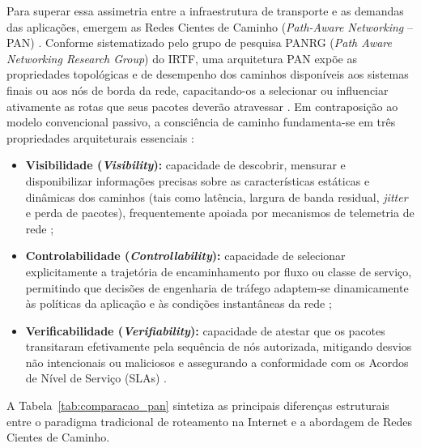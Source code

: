 Para superar essa assimetria entre a infraestrutura de transporte e as demandas das aplicações, emergem as Redes Cientes de Caminho (\textit{Path-Aware Networking} -- PAN) \cite{trammell2022rfc, borges2024pot}. Conforme sistematizado pelo grupo de pesquisa PANRG (\textit{Path Aware Networking Research Group}) do IRTF, uma arquitetura PAN expõe as propriedades topológicas e de desempenho dos caminhos disponíveis aos sistemas finais ou aos nós de borda da rede, capacitando-os a selecionar ou influenciar ativamente as rotas que seus pacotes deverão atravessar \cite{trammell2022rfc, wei2026panqosr}. Em contraposição ao modelo convencional passivo, a consciência de caminho fundamenta-se em três propriedades arquiteturais essenciais \cite{borges2024pot}:
\begin{itemize}
    \item \textbf{Visibilidade (\textit{Visibility}):} capacidade de descobrir, mensurar e disponibilizar informações precisas sobre as características estáticas e dinâmicas dos caminhos (tais como latência, largura de banda residual, \textit{jitter} e perda de pacotes), frequentemente apoiada por mecanismos de telemetria de rede \cite{trammell2022rfc, borges2024pot};
    \item \textbf{Controlabilidade (\textit{Controllability}):} capacidade de selecionar explicitamente a trajetória de encaminhamento por fluxo ou classe de serviço, permitindo que decisões de engenharia de tráfego adaptem-se dinamicamente às políticas da aplicação e às condições instantâneas da rede \cite{borges2024pot, wei2026panqosr};
    \item \textbf{Verificabilidade (\textit{Verifiability}):} capacidade de atestar que os pacotes transitaram efetivamente pela sequência de nós autorizada, mitigando desvios não intencionais ou maliciosos e assegurando a conformidade com os Acordos de Nível de Serviço (SLAs) \cite{borges2024pot}.
\end{itemize}

A Tabela~\ref{tab:comparacao_pan} sintetiza as principais diferenças estruturais entre o paradigma tradicional de roteamento na Internet e a abordagem de Redes Cientes de Caminho.

